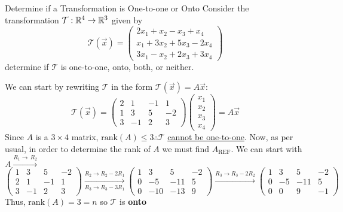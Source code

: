 \begin{example}{Determine if a Transformation is One-to-one or Onto}{}
    Consider the transformation $\mathcal{T}: \mathbb R^{4} \to \mathbb R^{3}$ given by
    \[
        \mathcal{T}\left(\vec{x}\right) = \begin{pmatrix}
            2x_1 + x_2 - x_3 + x_4 \\
            x_1 + 3x_2 + 5x_3 - 2x_4 \\
            3x_1 - x_2 + 2x_3 + 3x_4
        \end{pmatrix} 
    \]
    determine if $\mathcal{T}$ is one-to-one, onto, both, or neither.
    \begin{solution}
        We can start by rewriting $\mathcal{T}$ in the form $\mathcal{T}\left(\vec{x}\right) = A\vec{x}$:
        \[
            \mathcal{T}\left(\vec{x}\right) = \begin{pmatrix}
                2 & 1 & -1 & 1 \\
                1 & 3 & 5 & -2 \\
                3 & -1 & 2 & 3
            \end{pmatrix}
            \begin{pmatrix}
                x_1 \\ x_2 \\ x_3 \\ x_4
            \end{pmatrix}
            = A\vec{x}
        \]
        Since $A$ is a $3 \times 4$ matrix, $\text{rank}\left(A\right) \leq 3 \therefore \mathcal{T}$ \underline{cannot be one-to-one}. Now, as per usual, in order to determine the rank of $A$ we must find $A_{\text{REF}}$. We can start with $A \xrightarrow{R_1\to\,R_2}$
        \[
            \begin{pmatrix}
                1 & 3 & 5 & -2 \\
                2 & 1 & -1 & 1 \\
                3 & -1 & 2 & 3
            \end{pmatrix}
            \xrightarrow[R_3 \to R_3 - 3R_1]{R_2 \to R_2 - 2R_1} 
            \begin{pmatrix}
                1 & 3 & 5 & -2 \\
                0 & -5 & -11 & 5 \\
                0 & -10 & -13 & 9
            \end{pmatrix}
            \xrightarrow{R_3 \to R_3 - 2R_2}
            \begin{pmatrix}
                1 & 3 & 5 & -2 \\
                0 & -5 & -11 & 5 \\
                0 & 0 & 9 & -1
            \end{pmatrix}
        \]
        Thus, $\text{rank}\left(A\right) = 3 = n$ so $\mathcal{T}$ is \textbf{onto}
    \end{solution}
\end{example}

